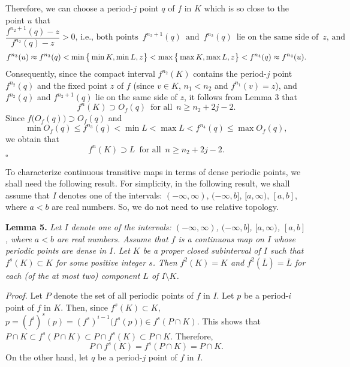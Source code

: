 \documentclass[12pt]{article}
\newcommand{\sq}{$\square$}
\begin{document}
Therefore, we can choose a period-$j$ point $q$ of $f$ in $K$ which is so close to the point $u$ that
$$
\frac {f^{n_2+1}(q) - z}{f^{n_2}(q) - z} > 0, \, \text{i.e., both points} \,\,\, f^{n_2+1}(q) \,\,\, \text{and} \,\,\, f^{n_2}(q) \,\,\, \text{lie on the same side of} \,\,\, z, \, \text{and}
$$
$$
f^{n_3}(u) \approx f^{n_3}(q) < \min \big\{\min K, \min L, z \big\} < \max \big\{\max K, \max L, z \big\} < f^{n_4}(q) \approx f^{n_4}(u).\vspace{.1in}
$$ 
\indent Consequently, since the compact interval $f^{n_2}(K)$ contains the period-$j$ point $f^{n_2}(q)$ and the fixed point $z$ of $f$ (since $v \in K$, $n_1 < n_2$ and $f^{n_1}(v) = z$), and $f^{n_2}(q)$ and $f^{n_2+1}(q)$ lie on the same side of $z$, it follows from Lemma 3 that   
$$
f^n(K) \supset O_f(q) \,\,\, \text{for all} \,\,\, n \ge n_2+2j-2.
$$
\indent Since $f\big(O_f(q)\big) \supset O_f(q)$ and $$\min O_f(q) \le f^{n_3}(q) < \min L < \max L < f^{n_4}(q) \le \max O_f(q),$$we obtain that$$f^n(K) \supset L \,\,\, \text{for all} \,\,\, n \ge n_2+2j-2.$$
\hfill\sq

To characterize continuous transitive maps in terms of dense periodic points, we shall need the following result.  For simplicity, in the following result, we shall assume that $I$ denotes one of the intervals: $(-\infty, \infty)$, $(-\infty, b]$, $[a, \infty)$, $[a, b]$, where $a < b$ are real numbers.  So, we do not need to use relative topology.

\noindent
{\bf Lemma 5.} 
{\it Let $I$ denote one of the intervals: $(-\infty, \infty)$, $(-\infty, b]$, $[a, \infty)$, $[a, b]$, where $a < b$ are real numbers.  Assume that $f$ is a continuous map on $I$ whose periodic points are dense in $I$.  Let $K$ be a proper closed subinterval of $I$ such that $f^s(K) \subset K$ for some positive integer $s$.  Then $f^2(K) = K$ and $f^2(\overline{L}) = \overline{L}$ for each (of the at most two) component $L$ of $I \setminus K$.}  

\noindent
{\it Proof.}  
Let $P$ denote the set of all periodic points of $f$ in $I$.  Let $p$ be a period-$i$ point of $f$ in $K$.  Then, since $f^s(K) \subset K$, $p = (f^i)^s(p) = (f^s)^{i-1}\big(f^s(p)\big) \in f^s(P \cap K)$.  This shows that $P \cap K \subset f^s(P \cap K) \subset P \cap f^s(K) \subset P \cap K$.  Therefore, $$P \cap f^s(K) = f^s(P \cap K) = P \cap K.$$ 
\indent On the other hand, let $q$ be a period-$j$ point of $f$ in $I$.  
\end{document}

